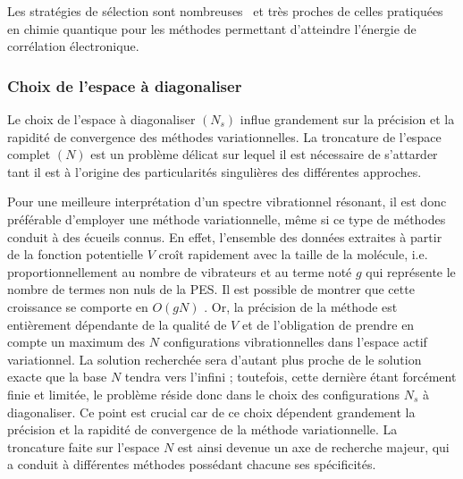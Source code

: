 \documentclass[12pt,a4paper]{book}
\begin{document}
Les stratégies de sélection sont nombreuses~\cite{pouchan1997ab,carter1997vibrational,koput2001ab,cassam2003alternative,gohaud2005new,culot1995vibrational} et très proches de celles pratiquées en chimie quantique pour les méthodes permettant d'atteindre l'énergie de corrélation électronique. 


\subsubsection*{Choix de l'espace à diagonaliser} 

Le choix de l'espace à diagonaliser $(N_s)$ influe grandement sur la précision et la rapidité de convergence des méthodes variationnelles. La troncature de l'espace complet $(N)$ est un problème délicat sur lequel il est nécessaire de s'attarder tant il est à l'origine des particularités singulières des différentes approches.

Pour une meilleure interprétation d'un spectre vibrationnel résonant, il est donc préférable d'employer une méthode variationnelle, même si ce type de méthodes conduit à des écueils connus. En effet, l'ensemble des données extraites à partir de la fonction potentielle $V$ croît rapidement avec la taille de la molécule, i.e. proportionnellement au nombre de vibrateurs et au terme noté $g$ qui représente le nombre de termes non nuls de la PES. Il est possible de montrer que cette croissance se comporte en $O(gN)$ \cite{colaud2016}. Or, la précision de la méthode est entièrement dépendante de la qualité de $V$ et de l'obligation de prendre en compte un maximum des $N$ configurations vibrationnelles dans l’espace actif variationnel. La solution recherchée sera d'autant plus proche de le solution exacte que la base $N$ tendra vers l'infini ; toutefois, cette dernière étant forcément finie et limitée, le problème réside donc dans le choix des configurations $N_{s}$ à diagonaliser. Ce point est crucial car de ce choix dépendent grandement la précision et la rapidité de convergence de la méthode variationnelle. La troncature faite sur l'espace $N$ est ainsi devenue un axe de recherche majeur, qui a conduit à différentes méthodes possédant chacune ses spécificités.
\end{document}
